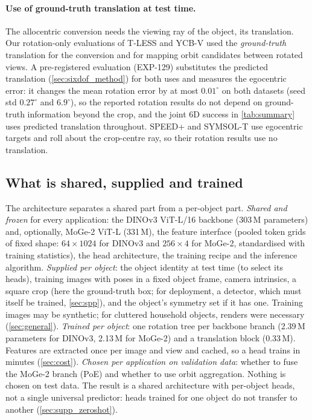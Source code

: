 \paragraph{Use of ground-truth translation at test time.} The allocentric conversion needs the viewing ray of the object, \ie its translation. Our rotation-only evaluations of T-LESS and YCB-V used the \emph{ground-truth} translation for the conversion and for mapping orbit candidates between rotated views. A pre-registered evaluation (EXP-129) substitutes the predicted translation (\cref{sec:sixdof_method}) for both uses and measures the egocentric error: it changes the mean rotation error by at most $0.01^\circ$ on both datasets (seed std $0.27^\circ$ and $6.9^\circ$), so the reported rotation results do not depend on ground-truth information beyond the crop, and the joint 6D success in \cref{tab:summary} uses predicted translation throughout. SPEED+ and SYMSOL-T use egocentric targets and roll about the crop-centre ray, so their rotation results use no translation.

\subsection{What is shared, supplied and trained}
\label{sec:interface}
The architecture separates a shared part from a per-object part.
\emph{Shared and frozen} for every application: the DINOv3 ViT-L/16 backbone (303\,M parameters) and, optionally, MoGe-2 ViT-L (331\,M), the feature interface (pooled token grids of fixed shape: $64\times1024$ for DINOv3 and $256\times4$ for MoGe-2, standardised with training statistics), the head architecture, the training recipe and the inference algorithm.
\emph{Supplied per object}: the object identity at test time (to select its heads), training images with poses in a fixed object frame, camera intrinsics, a square crop (here the ground-truth box; for deployment, a detector, which must itself be trained, \cref{sec:spp}), and the object's symmetry set if it has one. Training images may be synthetic; for cluttered household objects, renders were necessary (\cref{sec:general}).
\emph{Trained per object}: one rotation tree per backbone branch (2.39\,M parameters for DINOv3, 2.13\,M for MoGe-2) and a translation block (0.33\,M). Features are extracted once per image and view and cached, so a head trains in minutes (\cref{sec:cost}).
\emph{Chosen per application on validation data}: whether to fuse the MoGe-2 branch (PoE) and whether to use orbit aggregation. Nothing is chosen on test data.
The result is a shared architecture with per-object heads, not a single universal predictor: heads trained for one object do not transfer to another (\cref{sec:supp_zeroshot}).

